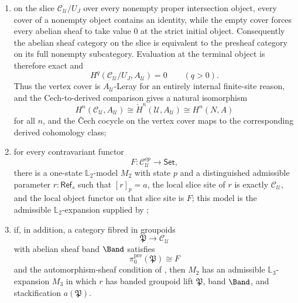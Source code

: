 \begin{lemma}
\begin{enumerate}[label=(\roman*),nosep]
cochain data after replacing $\mathcal C_a$ with
$\mathcal C_{\mathcal U}$. This is a cochain-level identification because
the cover is a chosen good cover: on connected nonempty basic
intersections \(A_{\mathcal U}\) has value \(A\), while on the strict
initial object it has value \(0\);
\item on the slice
\(\mathcal C_{\mathcal U}/U_J\) over every nonempty proper intersection
object, every cover of a nonempty object contains an identity, while the
empty cover forces every abelian sheaf to take value \(0\) at the strict
initial object. Consequently the abelian sheaf category on the slice is
equivalent to the presheaf category on its full nonempty subcategory.
Evaluation at the terminal object is therefore exact and
\[
H^q(\mathcal C_{\mathcal U}/U_J,A_{\mathcal U})=0
\qquad(q>0).
\]
Thus the vertex cover is \(A_{\mathcal U}\)-Leray for an entirely internal
finite-site reason, and the Cech-to-derived comparison gives a natural
isomorphism
\[
H^n(\mathcal C_{\mathcal U},A_{\mathcal U})\cong \check H^n(\mathcal U,A_{\mathcal U})\cong H^n(N,A)
\]
for all $n$, and the \v{C}ech cocycle on the vertex cover maps to the
corresponding derived cohomology class;
\item for every contravariant functor
\[
F:\mathcal C_{\mathcal U}^{op}\to\mathsf{Set},
\]
there is a one-state $\mathbb L_2$-model $M_2$ with state $p$ and a
distinguished admissible parameter $r:\mathsf{Ref}_s$ such that $[r]_p=a$, the
local slice site of $r$ is exactly $\mathcal C_{\mathcal U}$, and the local
object functor on that slice site is $F$; this model is the admissible
$\mathbb L_2$-expansion supplied by
;
\item if, in addition, a category fibred in groupoids
\[
\mathfrak P\to\mathcal C_{\mathcal U}
\]
with abelian sheaf band $\Band$ satisfies
\[
\pi_0^{\mathrm{pre}}(\mathfrak P)\cong F
\]
and the automorphism-sheaf condition of
, then $M_2$ has an admissible
$\mathbb L_3$-expansion $M_3$ in which $r$ has banded groupoid lift
$\mathfrak P$, band $\Band$, and stackification $a(\mathfrak P)$.
\end{enumerate}
\end{lemma}

